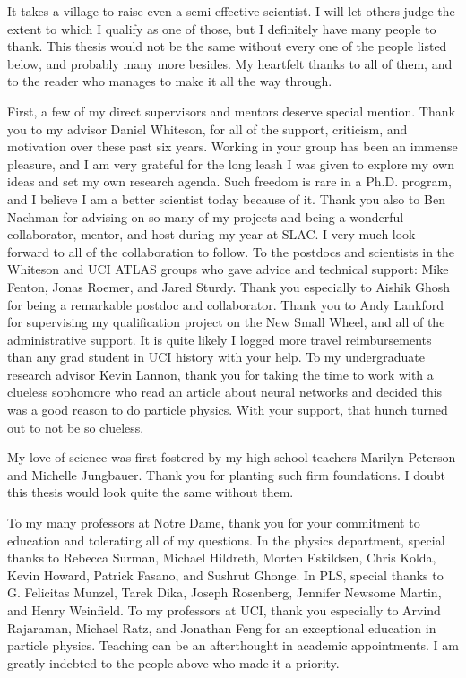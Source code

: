\acknowledgments
{
  It takes a village to raise even a semi-effective scientist.
  I will let others judge the extent to which I qualify as one of those, but I definitely have many people to thank.
  This thesis would not be the same without every one of the people listed below, and probably many more besides.
  My heartfelt thanks to all of them, and to the reader who manages to make it all the way through.
  
  First, a few of my direct supervisors and mentors deserve special mention.
  Thank you to my advisor Daniel Whiteson, for all of the support, criticism, and motivation over these past six years.
  Working in your group has been an immense pleasure, and I am very grateful for the long leash I was given to explore my own ideas and set my own research agenda.
  Such freedom is rare in a Ph.D. program, and I believe I am a better scientist today because of it.
  Thank you also to Ben Nachman for advising on so many of my projects and being a wonderful collaborator, mentor, and host during my year at SLAC.
  I very much look forward to all of the collaboration to follow.
  To the postdocs and scientists in the Whiteson and UCI ATLAS groups who gave advice and technical support: Mike Fenton, Jonas Roemer, and Jared Sturdy.
  Thank you especially to Aishik Ghosh for being a remarkable postdoc and collaborator.
  Thank you to Andy Lankford for supervising my qualification project on the New Small Wheel, and all of the administrative support.
  It is quite likely I logged more travel reimbursements than any grad student in UCI history with your help.
  To my undergraduate research advisor Kevin Lannon, thank you for taking the time to work with a clueless sophomore who read an article about neural networks and decided this was a good reason to do particle physics.
  With your support, that hunch turned out to not be so clueless.

  My love of science was first fostered by my high school teachers Marilyn Peterson and Michelle Jungbauer.
  Thank you for planting such firm foundations.
  I doubt this thesis would look quite the same without them.

  To my many professors at Notre Dame, thank you for your commitment to education and tolerating all of my questions.
  In the physics department, special thanks to Rebecca Surman, Michael Hildreth, Morten Eskildsen, Chris Kolda, Kevin Howard, Patrick Fasano, and Sushrut Ghonge.
  In PLS, special thanks to G. Felicitas Munzel, Tarek Dika, Joseph Rosenberg, Jennifer Newsome Martin, and Henry Weinfield.
  To my professors at UCI, thank you especially to Arvind Rajaraman, Michael Ratz, and Jonathan Feng for an exceptional education in particle physics.
  Teaching can be an afterthought in academic appointments.
  I am greatly indebted to the people above who made it a priority.

}
